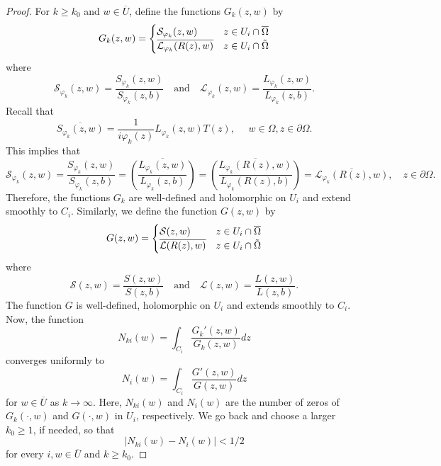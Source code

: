 \documentclass[10pt,a4paper]{amsart}
\newcommand{\Om}{\Omega}
\newcommand{\ov}{\overline}
\begin{document}
\begin{proof}
		\medskip
		
		For $k\geq k_0$ and $w\in \ov{U}$, define the functions $G_k(z,w)$ by
		\begin{equation}
		G_k(z,w)
		=
		\begin{cases}
			\mathcal{S}_{\varphi_k}(z,w)& z\in U_i\cap \overline{\Omega}
			\\
			\overline{\mathcal{L}_{\varphi_k}(R(z),w)}& z\in U_i\cap \Tilde{\Omega}
		\end{cases}
		\end{equation}
		where 
		\begin{equation}
		\mathcal{S}_{\varphi_k}(z,w) = \frac{S_{\varphi_k}(z,w)}{S_{\varphi_k}(z,b)}
		\quad
		\text{and}
		\quad
		\mathcal{L}_{\varphi_k}(z,w) = \frac{L_{\varphi_k}(z,w)}{L_{\varphi_k}(z,b)}.
		\end{equation}
		Recall that
		\[
			\overline{S_{\varphi_k}(z,w)} = \frac{1}{i\varphi_k(z)}L_{\varphi_k}(z,w)T(z),
			\quad\,\,
			w\in\Om, z\in\partial\Omega.
		\]
		This implies that
		\[
		\mathcal{S}_{\varphi_k}(z,w)
		=
		\frac{S_{\varphi_k}(z,w)}{S_{\varphi_k}(z,b)}
		=
		\overline{\left(\frac{L_{\varphi_k}(z,w)}{L_{\varphi_k}(z,b)}\right)}
		=
		\overline{\left(\frac{L_{\varphi_k}(R(z),w)}{L_{\varphi_k}(R(z),b)}\right)}
		=
		\overline{\mathcal{L}_{\varphi_k}(R(z),w)},
		\quad
		z\in\partial\Om.
		\]
		Therefore, the functions $G_k$ are well-defined and holomorphic on $U_i$ and extend smoothly to $C_i$. Similarly, we define the function $G(z,w)$ by
		\begin{equation}
		G(z,w)
		=
		\begin{cases}
			\mathcal{S}(z,w)& z\in U_i\cap \overline{\Omega}
			\\
			\overline{\mathcal{L}(R(z),w)}& z\in U_i\cap \Tilde{\Omega}
		\end{cases}
		\end{equation}
		where 
		\begin{equation}
		\mathcal{S}(z,w) = \frac{S(z,w)}{S(z,b)}
		\quad
		\text{and}
		\quad
		\mathcal{L}(z,w) = \frac{L(z,w)}{L(z,b)}.
		\end{equation}
		The function $G$ is well-defined, holomorphic on $U_i$ and extends smoothly to $C_i$. 
		Now, the function 
		\begin{equation}
		N_{ki}(w) = \int_{C_i} \frac{{G_k}'(z, w)}{G_k(z,w)} dz
		\end{equation}
		converges uniformly to 
		\begin{equation}
		N_i(w)=\int_{C_i}  \frac{{G}'(z, w)}{G(z,w)} dz
		\end{equation}
		for $w\in \overline{U}$ as $k\rightarrow\infty$. Here, $N_{ki}(w)$ and $N_i(w)$ are the number of zeros of $G_k(\cdot, w)$ and $G(\cdot,w)$ in $U_i$, respectively. We go back and choose a larger $k_0 \ge 1$, if needed, so that
		\[
		\vert N_{ki}(w) - N_i(w)\vert < 1/2
        \]
		for every $i,w\in \overline{U}$ and $k\geq k_0$.


\end{proof}
\end{document}
